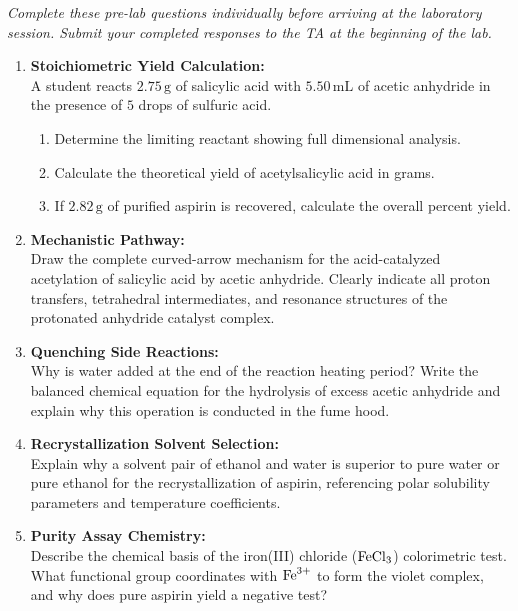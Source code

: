 \documentclass[10pt,a4paper]{article}
\begin{document}
\begin{tcolorbox}[
  enhanced,
  colback=white,
  colframe=BorderGray,
  boxrule=0.5pt,
  arc=3pt,
  left=8pt, right=8pt, top=6pt, bottom=6pt
]
\small
\textit{Complete these pre-lab questions individually before arriving at the laboratory session. Submit your completed responses to the TA at the beginning of the lab.}

\begin{enumerate}[label=\textbf{Q\arabic*.}, leftmargin=2em, itemsep=6pt, topsep=2pt]
  \item \textbf{Stoichiometric Yield Calculation:}\\{}
    A student reacts $2.75\,\text{g}$ of salicylic acid with $5.50\,\text{mL}$ of acetic anhydride in the presence of $5$ drops of sulfuric acid.
    \begin{enumerate}[label=(\alph*), leftmargin=1.5em, itemsep=2pt]
      \item Determine the limiting reactant showing full dimensional analysis.
      \item Calculate the theoretical yield of acetylsalicylic acid in grams.
      \item If $2.82\,\text{g}$ of purified aspirin is recovered, calculate the overall percent yield.
    \end{enumerate}

  \item \textbf{Mechanistic Pathway:}\\{}
    Draw the complete curved-arrow mechanism for the acid-catalyzed acetylation of salicylic acid by acetic anhydride. Clearly indicate all proton transfers, tetrahedral intermediates, and resonance structures of the protonated anhydride catalyst complex.

  \item \textbf{Quenching Side Reactions:}\\{}
    Why is water added at the end of the reaction heating period? Write the balanced chemical equation for the hydrolysis of excess acetic anhydride and explain why this operation is conducted in the fume hood.

  \item \textbf{Recrystallization Solvent Selection:}\\{}
    Explain why a solvent pair of ethanol and water is superior to pure water or pure ethanol for the recrystallization of aspirin, referencing polar solubility parameters and temperature coefficients.

  \item \textbf{Purity Assay Chemistry:}\\{}
    Describe the chemical basis of the iron(III) chloride ($\ce{FeCl3}$) colorimetric test. What functional group coordinates with $\ce{Fe^{3+}}$ to form the violet complex, and why does pure aspirin yield a negative test?
\end{enumerate}
\end{tcolorbox}
\end{document}
